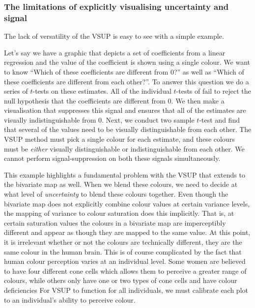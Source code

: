 \documentclass[
  12pt]{article}
\begin{document}
\subsubsection{The limitations of explicitly visualising uncertainty and
signal}\label{the-limitations-of-explicitly-visualising-uncertainty-and-signal}

The lack of versatility of the VSUP is easy to see with a simple
example.

Let's say we have a graphic that depicts a set of coefficients from a
linear regression and the value of the coefficient is shown using a
single colour. We want to know ``Which of these coefficients are
different from 0?'' as well as ``Which of these coefficients are
different from each other?''. To answer this question we do a series of
\(t\)-tests on these estimates. All of the individual \(t\)-tests of
fail to reject the null hypothesis that the coefficients are different
from 0. We then make a visualisation that suppresses this signal and
ensures that all of the estimates are visually indistinguishable from 0.
Next, we conduct two sample \(t\)-test and find that several of the
values need to be visually distinguishable from each other. The VSUP
method must pick a single colour for each estimate, and these colours
must be \emph{either} visually distinguishable or indistinguishable from
each other. We cannot perform signal-suppression on both these signals
simultaneously.

This example highlights a fundamental problem with the VSUP that extends
to the bivariate map as well. When we blend these colours, we need to
decide at what level of \emph{uncertainty} to blend these colours
together. Even though the bivariate map does not explicitly combine
colour values at certain variance levels, the mapping of variance to
colour saturation does this implicitly. That is, at certain saturation
values the colours in a bivariate map are imperceptibly different and
appear as though they are mapped to the same value. At this point, it is
irrelevant whether or not the colours are technically different, they
are the same colour in the human brain. This is of course complicated by
the fact that human colour perception varies at an individual level.
Some women are believed to have four different cone cells which allows
them to perceive a greater range of colours, while others only have one
or two types of cone cells and have colour deficiencies
\citep{simunovic2010} For VSUP to function for all individuals, we must
calibrate each plot to an individual's ability to perceive colour.
\end{document}
